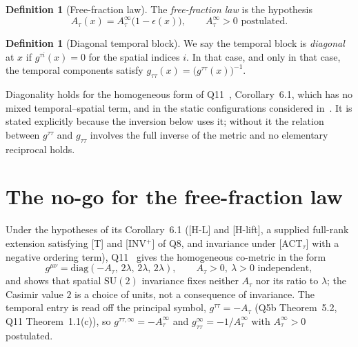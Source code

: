 \documentclass[12pt,a4paper]{article}
\theoremstyle{remark}
\theoremstyle{definition}
\newtheorem{definition}[theorem]{Definition}
\newcommand{\SU}{\mathrm{SU}}
\begin{document}
    \begin{definition}[Free-fraction law]
      \label{def:ansatz}
      The \emph{free-fraction law} is the hypothesis
      \begin{equation}\label{eq:ansatz}
        A_{\tau}(x)=A_{\tau}^{\infty}\bigl(1-\epsilon(x)\bigr),
        \qquad A_{\tau}^{\infty}>0 \text{ postulated}.
      \end{equation}
    \end{definition}

    \begin{definition}[Diagonal temporal block]
      \label{def:diagonal}
      We say the temporal block is \emph{diagonal} at $x$ if $g^{\tau i}(x)=0$ for the spatial indices
      $i$.
      In that case, and only in that case, the temporal components satisfy
      $g_{\tau\tau}(x)=\bigl(g^{\tau\tau}(x)\bigr)^{-1}$.
    \end{definition}

    Diagonality holds for the homogeneous form of Q11~\cite{Beau2026q11}, Corollary~6.1, which has no mixed
    temporal--spatial term, and in the static configurations considered in~\cite{Beau2026lco2}.
    It is stated explicitly because the inversion below uses it; without it the relation between
    $g^{\tau\tau}$ and $g_{\tau\tau}$ involves the full inverse of the metric and no elementary
    reciprocal holds.

  \section{The no-go for the free-fraction law}
    \label{sec:nogo}

    Under the hypotheses of its Corollary~6.1 ([H-L] and [H-lift], a supplied full-rank extension satisfying
    [T] and [INV$^+$] of Q8, and invariance under [ACT$_\tau$] with a negative ordering term),
    Q11~\cite{Beau2026q11} gives the homogeneous co-metric in the form
    \begin{equation}\label{eq:q11}
      g^{\mu\nu}=\mathrm{diag}(-A_{\tau},\,2\lambda,\,2\lambda,\,2\lambda),
      \qquad
      A_{\tau}>0,\ \lambda>0 \text{ independent},
    \end{equation}
    and shows that spatial $\SU(2)$ invariance fixes neither $A_{\tau}$ nor its ratio to $\lambda$; the Casimir value
    $2$ is a choice of units, not a consequence of invariance.
    The temporal entry is read off the principal symbol, $g^{\tau\tau}=-A_{\tau}$ (Q5b Theorem~5.2, Q11
    Theorem~1.1(c)), so $g^{\tau\tau,\infty}=-A_{\tau}^{\infty}$ and
    $g_{\tau\tau}^{\infty}=-1/A_{\tau}^{\infty}$ with $A_{\tau}^{\infty}>0$ postulated.
\end{document}
